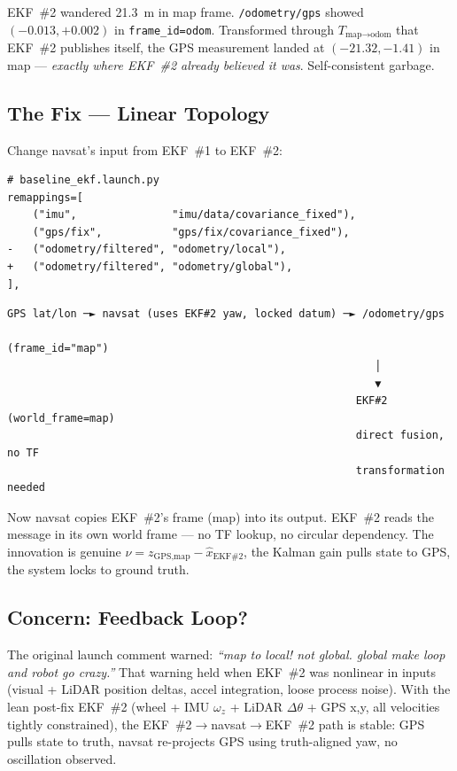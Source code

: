 \documentclass[11pt,a4paper]{article}
\begin{document}
\noindent
EKF~\#2 wandered 21.3~m in map frame. \texttt{/odometry/gps} showed
$(-0.013, +0.002)$ in \texttt{frame\_id=odom}. Transformed through $T_{\text{map}\to\text{odom}}$
that EKF~\#2 publishes itself, the GPS measurement landed at $(-21.32, -1.41)$ in map ---
\emph{exactly where EKF~\#2 already believed it was}. Self-consistent garbage.

\subsection{The Fix --- Linear Topology}

Change navsat's input from EKF~\#1 to EKF~\#2:

\begin{lstlisting}[language={}]
# baseline_ekf.launch.py
remappings=[
    ("imu",               "imu/data/covariance_fixed"),
    ("gps/fix",           "gps/fix/covariance_fixed"),
-   ("odometry/filtered", "odometry/local"),
+   ("odometry/filtered", "odometry/global"),
],
\end{lstlisting}

\begin{tcolorbox}[colback=green!5,colframe=green!50!black,title=Fixed topology]
\small
\begin{verbatim}
GPS lat/lon ─► navsat (uses EKF#2 yaw, locked datum) ─► /odometry/gps
                                                       (frame_id="map")
                                                          │
                                                          ▼
                                                       EKF#2  (world_frame=map)
                                                       direct fusion, no TF
                                                       transformation needed
\end{verbatim}
\end{tcolorbox}

\noindent
Now navsat copies EKF~\#2's frame (map) into its output. EKF~\#2 reads the message in its
own world frame --- no TF lookup, no circular dependency. The innovation is genuine
$\nu = z_{\text{GPS,map}} - \hat{x}_{\text{EKF\#2}}$, the Kalman gain pulls state to GPS,
the system locks to ground truth.

\subsection{Concern: Feedback Loop?}

The original launch comment warned: \emph{``map to local! not global. global make loop and
robot go crazy.''} That warning held when EKF~\#2 was nonlinear in inputs (visual + LiDAR
position deltas, accel integration, loose process noise). With the lean post-fix EKF~\#2
(wheel + IMU $\omega_z$ + LiDAR $\Delta\theta$ + GPS x,y, all velocities tightly constrained),
the EKF~\#2$\to$navsat$\to$EKF~\#2 path is stable: GPS pulls state to truth, navsat
re-projects GPS using truth-aligned yaw, no oscillation observed.
\end{document}
